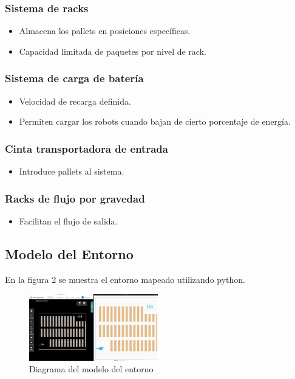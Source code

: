 \documentclass[sjournal]{IEEEtran}
\begin{document}
\subsubsection*{Sistema de racks}
\begin{itemize}
    \item Almacena los pallets en posiciones específicas.
    \item Capacidad limitada de paquetes por nivel de rack.
\end{itemize}

\subsubsection*{Sistema de carga de batería}
\begin{itemize}
    \item Velocidad de recarga definida.
    \item Permiten cargar los robots cuando bajan de cierto porcentaje de energía.
\end{itemize}

\subsubsection*{Cinta transportadora de entrada}
\begin{itemize}
    \item Introduce pallets al sistema.
\end{itemize}

\subsubsection*{Racks de flujo por gravedad}
\begin{itemize}
    \item Facilitan el flujo de salida.
\end{itemize}

\subsection{Modelo del Entorno}
En la figura 2 se muestra el entorno mapeado utilizando python.
\begin{figure}[h!]
    \centering
    \includegraphics[width=0.5\textwidth]{modeloEntorno.jpeg}
    \caption{Diagrama del modelo del entorno}
    \label{fig:modeloEntorno}
\end{figure}
\end{document}
